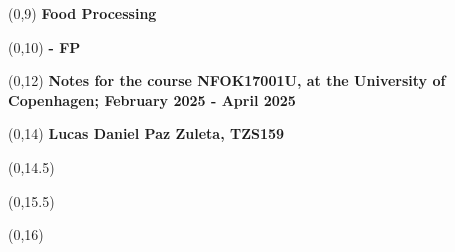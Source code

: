 \begin{titlepage}


\begin{textblock}{9.4}(0,9)
    \Huge{\sffamily\bfseries{Food Processing}}
\end{textblock}
\begin{textblock}{9.4}(0,10)
    \Huge{\sffamily\bfseries{- FP}}
\end{textblock}

\begin{textblock}{9.4}(0,12)
    \LARGE{\sffamily\bfseries{Notes for the course NFOK17001U, at the University of Copenhagen; February 2025 - April 2025}}
\end{textblock}

\begin{textblock}{9.4}(0,14)
    \large{\sffamily\bfseries{Lucas Daniel Paz Zuleta, TZS159}}
\end{textblock}

\begin{textblock}{9.4}(0,14.5)
    \large{}
\end{textblock}

\begin{textblock}{9.4}(0,15.5)
    \large{}
\end{textblock}

\begin{textblock}{8.4}(0,16)
    \large{}
\end{textblock}


\end{titlepage}

